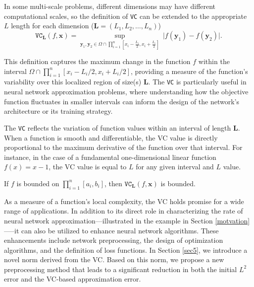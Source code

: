 \documentclass[final]{siamart220329}
\newtheorem{theoretical insights}{Theoretical insights}
\newtheorem{practical takeaway}{Practical takeaway}
\begin{document}
{\begin{remark}
In some multi-scale problems, different dimensions may have different computational scales, so the definition of \texttt{VC} can be extended to the appropriate ${L}$ length for each dimension (${\bm{L}} = (L_1,L_2,\dots,L_n)$)
\begin{equation*}
\texttt{VC}_{\bm{L}}(f,{\bm x}) = \sup_{{\bm y}_1, {\bm y}_2 \in \Omega \cap \prod_{i=1}^{n} [{x}_i-\frac{L_i}{2}, {x}_i+\frac{L_i}{2}]} \ \vert f({\bm y}_1)-f({\bm y}_2)\vert. 
\end{equation*}
\end{remark}}

This definition captures the maximum change in the function \(f\) within the interval \(\Omega \cap \prod_{i=1}^{n} [x_i-L_i/2, x_i+L_i/2]\), providing a measure of the function's variability over this localized region of size(s) \(\bm{L}\). The \texttt{VC} is particularly useful in neural network approximation problems, where understanding how the objective function fluctuates in smaller intervals can inform the design of the network's architecture or its training strategy.


The \texttt{VC} reflects the variation of function values within an interval of length $\bm{L}$. When a function is smooth and differentiable, the {\ttfamily VC} value is directly proportional to the maximum derivative of the function over that interval. For instance, in the case of a fundamental one-dimensional linear function \( f(x) = x-1 \), the {\ttfamily VC} value is equal to $L$ for any given interval and $L$ value.




\begin{remark}
If  \(f\) is bounded on \(\prod_{i=1}^{n} [a_i, b_i]\), then \(\texttt{VC}_{\bm{L}}(f,\bm{x})\) is bounded.
\end{remark}


\begin{remark}
As a measure of a function's local complexity, the VC holds promise for a wide range of applications. In addition to its direct role in characterizing the rate of neural network approximation—illustrated in the example in Section \ref{motvation}—--it can also be utilized to enhance neural network algorithms. These enhancements include network preprocessing, the design of optimization algorithms, and the definition of loss functions. In Section \ref{sec5}, we introduce a novel norm derived from the VC. Based on this norm, we propose a new preprocessing method that leads to a significant reduction in both the initial $L^2$  error and the VC-based approximation error.
\end{remark}
\end{document}
